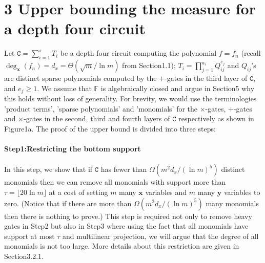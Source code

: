 \section*{3 Upper bounding the measure for a depth four circuit}
Let $\mathtt C=\sum_{i=1}^sT_i$ be a depth four circuit computing the polynomial $f=f_n$ (recall $\deg_{\mathbf x}(f_n)=d_x=\Theta(\sqrt m/\ln m)$ from Section1.1); $T_i=\prod_{j=1}^{a_i}Q_{ij}^{e_j}$ and $Q_{ij}$'s are distinct sparse polynomials computed by the $+$-gates in the third layer of $\mathtt C$, and $e_j\ge1$. We assume that $\mathbb F$ is algebraically closed and argue in Section5 why this holds without loss of generality. For brevity, we would use the terminologies 'product terms', 'sparse polynomials' and 'monomials' for the $\times$-gates, $+$-gates and $\times$-gates in the second, third and fourth layers of $\mathtt C$ respectively as shown in Figure1a. The proof of the upper bound is divided into three steps:
\paragraph{Step1:Restricting the bottom support}
In this step, we show that if $\mathtt C$ has fewer than $\Omega(m^2d_x/(\ln m)^5)$ distinct monomials then we can remove all monomials with support more than $\tau=\lfloor20\ln m\rfloor$ at a cost of setting $m$ many $\mathbf x$ variables and $m$ many $\mathbf y$ variables to zero. (Notice that if there are more than $\Omega(m^2d_x/(\ln m)^5)$ many monomials then there is nothing to prove.) This step is required not only to remove heavy gates in Step2 but also in Step3 where using the fact that all monomials have support at most $\tau$ and multilinear projection, we will argue that the degree of all monomials is not too large. More details about this restriction are given in Section3.2.1.
